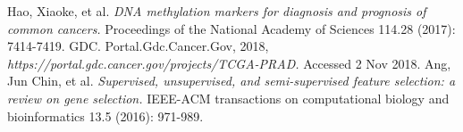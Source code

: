 \documentclass[a4paper,oneside]{article}
\begin{document}
\begin{thebibliography}{1}
 Hao, Xiaoke, et al. {\em DNA methylation markers for diagnosis and prognosis of common cancers.} Proceedings of the National Academy of Sciences 114.28 (2017): 7414-7419.
 GDC. Portal.Gdc.Cancer.Gov, 2018, {\em https://portal.gdc.cancer.gov/projects/TCGA-PRAD.} Accessed 2 Nov 2018.
 Ang, Jun Chin, et al. {\em Supervised, unsupervised, and semi-supervised feature selection: a review on gene selection.} IEEE-ACM transactions on computational biology and bioinformatics 13.5 (2016): 971-989.
\end{thebibliography}
\end{document}
